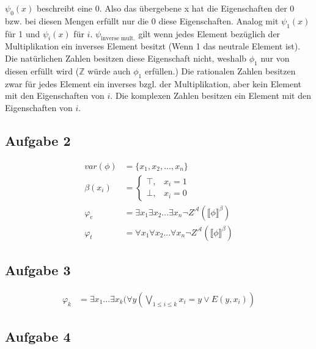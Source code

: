 \documentclass[a4paper,10pt]{article}
\begin{document}
\begin{enumerate}[(i)]
$\psi_0(x)$ beschreibt eine 0. Also das übergebene x hat die Eigenschaften der 0 bzw. bei diesen Mengen erfüllt nur die 0 diese Eigenschaften. Analog mit $\psi_1(x)$ für 1 und $\psi_i(x)$ für $i$. $\psi_{\text{inverse mult.}}$ gilt wenn jedes Element bezüglich der Multiplikation ein inverses Element besitzt (Wenn 1 das neutrale Element ist). Die natürlichen Zahlen besitzen diese Eigenschaft nicht, weshalb $\phi_1$ nur von diesen erfüllt wird ($\mathbb{Z}$ würde auch $\phi_1$ erfüllen.)
Die rationalen Zahlen besitzen zwar für jedes Element ein inverses bzgl. der Multiplikation, aber kein Element mit den Eigenschaften von $i$. Die komplexen Zahlen besitzen ein Element mit den Eigenschaften von $i$.
\end{enumerate}

\subsection*{Aufgabe 2}
\begin{align*}
	var(\phi) &= \{x_1,x_2,...,x_n\} \\
	\beta(x_i) &= 
	\begin{cases}
	\top, & x_i = 1 \\
	\bot, & x_i = 0
	\end{cases} \\
	\varphi_e &= \exists x_1 \exists x_2 ...\exists x_n \neg Z^{\mathcal{A}}( \llbracket \phi \rrbracket^{\beta}) \\
	\varphi_t &= \forall x_1 \forall x_2 ...\forall x_n \neg Z^{\mathcal{A}}( \llbracket \phi \rrbracket^{\beta})
\end{align*}

\subsection*{Aufgabe 3}
\begin{align*}
	\varphi_k &= \exists x_1...\exists x_k(\forall y( \bigvee_{1 \le i \le k} x_i = y \lor E(y,x_i))
\end{align*}
\newpage
\subsection*{Aufgabe 4}
\end{document}
